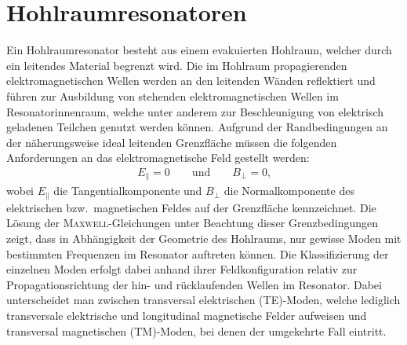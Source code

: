 \documentclass[11pt, a4paper]{scrbook}
\begin{document}
	\section{Hohlraumresonatoren}
	Ein Hohlraumresonator besteht aus einem evakuierten Hohlraum, welcher durch ein leitendes Material begrenzt wird.
	Die im Hohlraum propagierenden elektromagnetischen Wellen werden an den leitenden Wänden reflektiert und führen zur Ausbildung von stehenden elektromagnetischen Wellen im Resonatorinnenraum, welche unter anderem zur Beschleunigung von elektrisch geladenen Teilchen genutzt werden können.
	Aufgrund der Randbedingungen an der näherungsweise ideal leitenden Grenzfläche müssen die folgenden Anforderungen an das elektromagnetische Feld gestellt werden:
	\begin{align}
		E_\parallel = 0 \qquad \text{und} \qquad B_\perp = 0\text{,}
		\label{eq:randbedingung_leiter}
	\end{align}
	wobei $E_\parallel$ die Tangentialkomponente und $B_\perp$ die Normalkomponente des elektrischen bzw.\ magnetischen Feldes auf der Grenzfläche kennzeichnet.
	Die Lösung der \textsc{Maxwell}-Gleichungen unter Beachtung dieser Grenzbedingungen zeigt, dass in Abhängigkeit der Geometrie des Hohlraums, nur gewisse Moden mit bestimmten Frequenzen im Resonator auftreten können.
	Die Klassifizierung der einzelnen Moden erfolgt dabei anhand ihrer Feldkonfiguration relativ zur Propagationsrichtung der hin- und rücklaufenden Wellen im Resonator.
	Dabei unterscheidet man zwischen transversal elektrischen (TE)-Moden, welche lediglich transversale elektrische und longitudinal magnetische Felder aufweisen und transversal magnetischen (TM)-Moden, bei denen der umgekehrte Fall eintritt.
	
\end{document}
